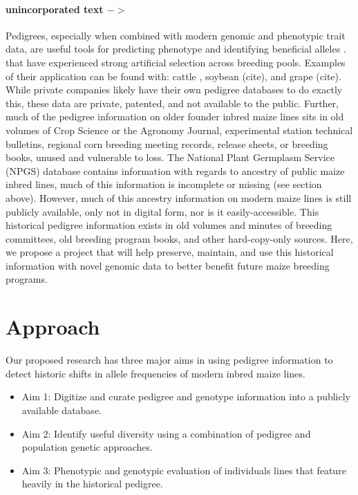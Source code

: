 \documentclass[draft,12pt]{article}
\begin{document}
\paragraph{unincorporated text $->$}
Pedigrees, especially when combined with modern genomic and phenotypic trait data, are useful tools for predicting phenotype \citep{crossa2010prediction} and identifying beneficial alleles \citep{sebastian1995method}.
 that have experienced strong artificial selection across breeding pools. Examples of their application can be found with: cattle \citep{Decker:2012kd}, soybean (cite), and grape (cite). 
While private companies likely have their own pedigree databases to do exactly this, these data are private, patented, and not available to the public. 
Further, much of the pedigree information on older founder inbred maize lines sits in old volumes of Crop Science or the Agronomy Journal, experimental station technical bulletins, regional corn breeding meeting records, release sheets, or breeding books, unused and vulnerable to loss.  
The National Plant Germplasm Service (NPGS) database contains information with regards to ancestry of public maize inbred lines, much of this information is incomplete or missing (see section above). 
However, much of this ancestry information on modern maize lines  is still publicly available, only not in digital form, nor is it easily-accessible. This historical pedigree information exists in old volumes and minutes of breeding committees, old breeding program books, and other hard-copy-only sources. Here, we propose a project that will help preserve, maintain, and use this historical information with novel genomic data to better benefit future maize breeding programs.

\section*{Approach}
\label{sec:approach}
Our proposed research has three major aims in using pedigree information to detect historic shifts in allele frequencies of modern inbred maize lines.

\begin{itemize}
\item Aim 1: Digitize and curate pedigree and genotype information into a publicly available database. 
\item Aim 2: Identify useful diversity using a combination of pedigree and population genetic approaches.
\item Aim 3: Phenotypic and genotypic evaluation of individuals lines that feature heavily in the historical pedigree.
\end{itemize}
\end{document}
